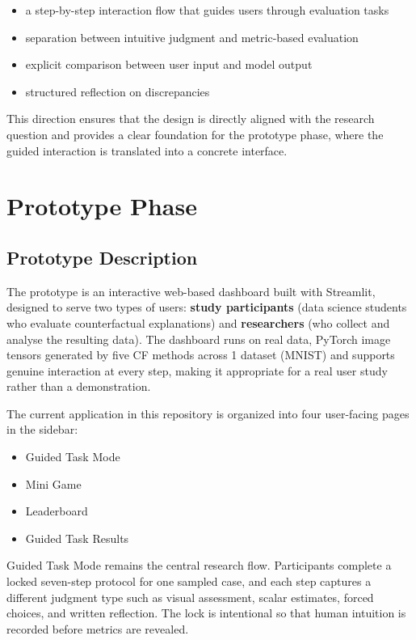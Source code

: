 \documentclass[
  letterpaper,
  DIV=11,
  numbers=noendperiod]{scrartcl}
\providecommand{\tightlist}{%
  \setlength{\itemsep}{0pt}\setlength{\parskip}{0pt}}\usepackage{longtable,booktabs,array}
\begin{document}
\begin{itemize}
\tightlist
\item
  a step-by-step interaction flow that guides users through evaluation
  tasks
\item
  separation between intuitive judgment and metric-based evaluation
\item
  explicit comparison between user input and model output
\item
  structured reflection on discrepancies
\end{itemize}

This direction ensures that the design is directly aligned with the
research question and provides a clear foundation for the prototype
phase, where the guided interaction is translated into a concrete
interface.

\section{Prototype Phase}\label{prototype-phase}

\subsection{Prototype Description}\label{prototype-description}

The prototype is an interactive web-based dashboard built with
Streamlit, designed to serve two types of users: \textbf{study
participants} (data science students who evaluate counterfactual
explanations) and \textbf{researchers} (who collect and analyse the
resulting data). The dashboard runs on real data, PyTorch image tensors
generated by five CF methods across 1 dataset (MNIST) and supports
genuine interaction at every step, making it appropriate for a real user
study rather than a demonstration.

The current application in this repository is organized into four
user-facing pages in the sidebar:

\begin{itemize}
\tightlist
\item
  Guided Task Mode
\item
  Mini Game
\item
  Leaderboard
\item
  Guided Task Results
\end{itemize}

Guided Task Mode remains the central research flow. Participants
complete a locked seven-step protocol for one sampled case, and each
step captures a different judgment type such as visual assessment,
scalar estimates, forced choices, and written reflection. The lock is
intentional so that human intuition is recorded before metrics are
revealed.
\end{document}
